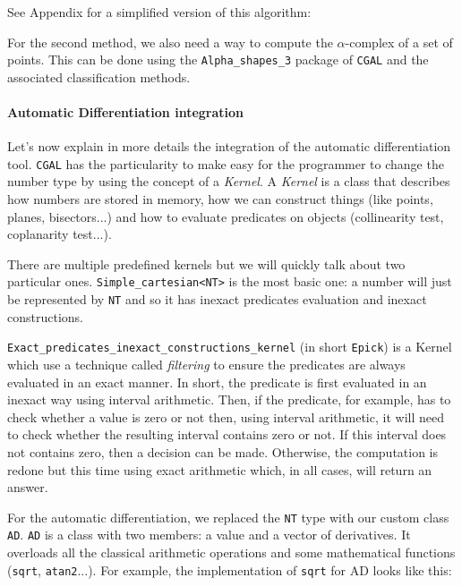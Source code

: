 See Appendix  for a simplified version
of this algorithm:

For the second method, we also need a way to compute the $\alpha$-complex of a
set of points. This can be done using the \texttt{Alpha\_shapes\_3} package of
\texttt{CGAL} and the associated classification methods.

\paragraph{Automatic Differentiation integration}

Let's now explain in more details the integration of the automatic
differentiation tool. \texttt{CGAL} has the particularity to make easy for the
programmer to change the number type by using the concept of a \emph{Kernel}. A
\emph{Kernel} is a class that describes how numbers are stored in memory, how we
can construct things (like points, planes, bisectors...) and how to evaluate
predicates on objects (collinearity test, coplanarity test...).

There are multiple predefined kernels but we will quickly talk about two
particular ones. \texttt{Simple\_cartesian<NT>} is the most basic one: a number
will just be represented by \texttt{NT} and so it has inexact predicates
evaluation and inexact constructions.

\texttt{Exact\_predicates\_inexact\_constructions\_kernel} (in short
\texttt{Epick}) is a Kernel which use a technique called \emph{filtering} to
ensure the predicates are always evaluated in an exact manner. In short, the
predicate is first evaluated in an inexact way using interval arithmetic.  Then,
if the predicate, for example, has to check whether a value is zero or not then,
using interval arithmetic, it will need to check whether the resulting interval
contains zero or not. If this interval does not contains zero, then a decision
can be made. Otherwise, the computation is redone but this time using exact
arithmetic which, in all cases, will return an answer.

For the automatic differentiation, we replaced the \texttt{NT} type with our
custom class \texttt{AD}. \texttt{AD} is a class with two members: a value and a
vector of derivatives. It overloads all the classical arithmetic operations and
some mathematical functions (\texttt{sqrt}, \texttt{atan2}...). For example, the
implementation of \texttt{sqrt} for AD looks like this:


